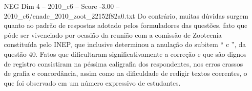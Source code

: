 \begin{textsample}{NEG Dim 4 – 2010\_c6 – Score -3.00 – 2010\_c6/enade\_2010\_zoot\_22152f82a0.txt}
Do contrário, muitas dúvidas surgem quanto ao padrão de respostas adotado pelos formuladores das questões, fato que pôde ser vivenciado por ocasião da reunião com a comissão de Zootecnia constituída pelo INEP, que inclusive determinou a anulação do subitem “ c ”, da questão 40.
Fatos que dificultaram significativamente a correção e que são dignos de registro consistiram na péssima caligrafia dos respondentes, nos erros crassos de grafia e concordância, assim como na dificuldade de redigir textos coerentes, o que foi observado em um número expressivo de estudantes.

\end{textsample}
